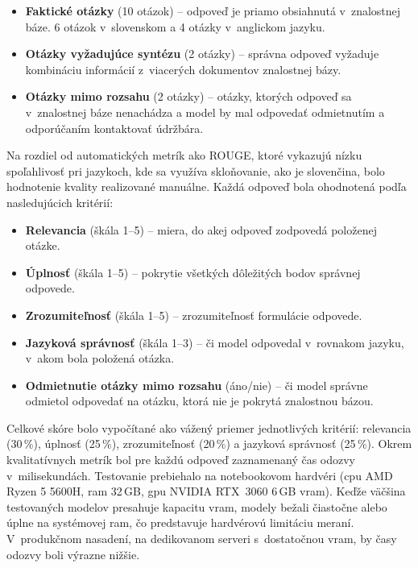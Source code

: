 \begin{itemize}
      \item \textbf{Faktické otázky} (10 otázok) -- odpoveď je priamo
            obsiahnutá v~znalostnej báze. 6 otázok v~slovenskom
            a 4 otázky v~anglickom jazyku.
      \item \textbf{Otázky vyžadujúce syntézu} (2 otázky) -- správna odpoveď
            vyžaduje kombináciu informácií z~viacerých dokumentov
            znalostnej bázy.
      \item \textbf{Otázky mimo rozsahu} (2 otázky) -- otázky,
            ktorých odpoveď sa v~znalostnej báze nenachádza a
            model by mal odpovedať odmietnutím a odporúčaním kontaktovať údržbára.
\end{itemize}

Na rozdiel od automatických metrík ako ROUGE, ktoré vykazujú nízku spoľahlivosť
pri jazykoch, kde sa využíva skloňovanie, ako je slovenčina, bolo hodnotenie
kvality realizované manuálne. Každá odpoveď bola ohodnotená podľa nasledujúcich
kritérií:

\begin{itemize}
      \item \textbf{Relevancia} (škála 1--5) -- miera, do akej odpoveď
            zodpovedá položenej otázke.
      \item \textbf{Úplnosť} (škála 1--5) -- pokrytie všetkých
            dôležitých bodov správnej odpovede.
      \item \textbf{Zrozumiteľnosť} (škála 1--5) -- zrozumiteľnosť formulácie odpovede.
      \item \textbf{Jazyková správnosť} (škála 1--3) -- či model
            odpovedal v~rovnakom jazyku, v~akom bola položená otázka.
      \item \textbf{Odmietnutie otázky mimo rozsahu} (áno/nie) --
            či model správne odmietol odpovedať na otázku,
            ktorá nie je pokrytá znalostnou bázou.
\end{itemize}

Celkové skóre bolo vypočítané ako vážený priemer jednotlivých kritérií:
relevancia (30\,\%), úplnosť (25\,\%), zrozumiteľnosť (20\,\%) a jazyková
správnosť (25\,\%).
\newpage
Okrem kvalitatívnych metrík bol pre každú odpoveď zaznamenaný čas odozvy
v~milisekundách. Testovanie prebiehalo na notebookovom hardvéri (\acrshort{cpu}
AMD Ryzen 5 5600H, \acrshort{ram} 32\,GB, \acrshort{gpu} NVIDIA RTX~3060 6\,GB
\acrshort{vram}). Keďže väčšina testovaných modelov presahuje kapacitu
\acrshort{vram}, modely bežali čiastočne alebo úplne na systémovej
\acrshort{ram}, čo predstavuje hardvérovú limitáciu meraní. V~produkčnom
nasadení, na dedikovanom serveri s~dostatočnou \acrshort{vram}, by časy odozvy
boli výrazne nižšie.


